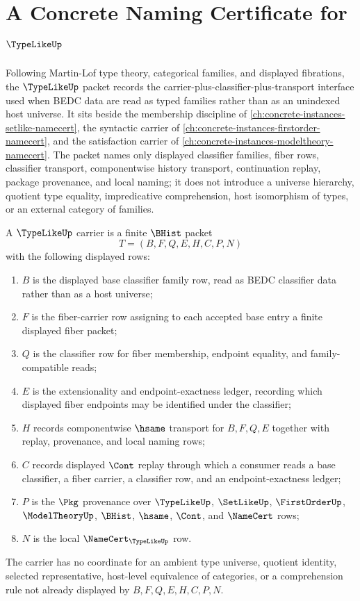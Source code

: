 \chapter{A Concrete Naming Certificate for $\TypeLikeUp$}
\label{ch:concrete-instances-typelike-namecert}

Following Martin-Lof type theory, categorical families, and displayed fibrations, the $\TypeLikeUp$ packet records the carrier-plus-classifier-plus-transport interface used when BEDC data are read as typed families rather than as an unindexed host universe. It sits beside the membership discipline of \autoref{ch:concrete-instances-setlike-namecert}, the syntactic carrier of \autoref{ch:concrete-instances-firstorder-namecert}, and the satisfaction carrier of \autoref{ch:concrete-instances-modeltheory-namecert}. The packet names only displayed classifier families, fiber rows, classifier transport, componentwise history transport, continuation replay, package provenance, and local naming; it does not introduce a universe hierarchy, quotient type equality, impredicative comprehension, host isomorphism of types, or an external category of families.

\begin{definition}
\label{def:typelike-carrier}
A $\TypeLikeUp$ carrier is a finite $\BHist$ packet
$$
T=(B,F,Q,E,H,C,P,N)
$$
with the following displayed rows:
\begin{enumerate}
\item $B$ is the displayed base classifier family row, read as BEDC classifier data rather than as a host universe;
\item $F$ is the fiber-carrier row assigning to each accepted base entry a finite displayed fiber packet;
\item $Q$ is the classifier row for fiber membership, endpoint equality, and family-compatible reads;
\item $E$ is the extensionality and endpoint-exactness ledger, recording which displayed fiber endpoints may be identified under the classifier;
\item $H$ records componentwise $\hsame$ transport for $B,F,Q,E$ together with replay, provenance, and local naming rows;
\item $C$ records displayed $\Cont$ replay through which a consumer reads a base classifier, a fiber carrier, a classifier row, and an endpoint-exactness ledger;
\item $P$ is the $\Pkg$ provenance over $\TypeLikeUp$, $\SetLikeUp$, $\FirstOrderUp$, $\ModelTheoryUp$, $\BHist$, $\hsame$, $\Cont$, and $\NameCert$ rows;
\item $N$ is the local $\NameCert_{\TypeLikeUp}$ row.
\end{enumerate}
The carrier has no coordinate for an ambient type universe, quotient identity, selected representative, host-level equivalence of categories, or a comprehension rule not already displayed by $B,F,Q,E,H,C,P,N$.
\end{definition}


